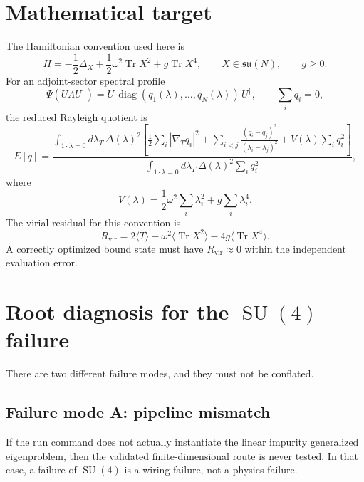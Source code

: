 \documentclass[11pt]{article}
\newcommand{\Tr}{\operatorname{Tr}}
\newcommand{\Rvir}{R_{\mathrm{vir}}}
\newcommand{\SU}{\operatorname{SU}}
\begin{document}
\section{Mathematical target}

The Hamiltonian convention used here is
\begin{equation}
H=-\frac12\Delta_X+\frac12\omega^2\Tr X^2+g\Tr X^4,
\qquad X\in\mathfrak{su}(N),\qquad g\ge 0.
\end{equation}
For an adjoint-sector spectral profile
\begin{equation}
\Psi(U\Lambda U^\dagger)=U\,\operatorname{diag}(q_1(\lambda),\ldots,q_N(\lambda))\,U^\dagger,
\qquad \sum_i q_i=0,
\end{equation}
the reduced Rayleigh quotient is
\begin{equation}
E[q]=
\frac{
\int_{1\cdot\lambda=0}d\lambda_T\,\Delta(\lambda)^2
\left[
\frac12\sum_i |\nabla_Tq_i|^2+
\sum_{i<j}\frac{(q_i-q_j)^2}{(\lambda_i-\lambda_j)^2}
+V(\lambda)\sum_i q_i^2
\right]
}{
\int_{1\cdot\lambda=0}d\lambda_T\,\Delta(\lambda)^2\sum_iq_i^2
},
\end{equation}
where
\begin{equation}
V(\lambda)=\frac12\omega^2\sum_i\lambda_i^2+g\sum_i\lambda_i^4.
\end{equation}
The virial residual for this convention is
\begin{equation}
\Rvir=2\langle T\rangle-
\omega^2\langle\Tr X^2\rangle-
4g\langle\Tr X^4\rangle.
\label{eq:virial}
\end{equation}
A correctly optimized bound state must have \(\Rvir\approx0\) within the independent evaluation error.

\section{Root diagnosis for the \(\SU(4)\) failure}

There are two different failure modes, and they must not be conflated.

\subsection{Failure mode A: pipeline mismatch}

If the run command does not actually instantiate the linear impurity generalized eigenproblem, then the validated finite-dimensional route is never tested. In that case, a failure of \(\SU(4)\) is a wiring failure, not a physics failure.
\end{document}
